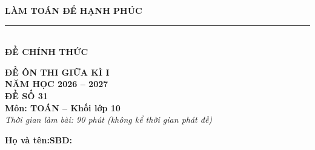 \documentclass[12pt,a4paper]{article}
\begin{document}
\noindent
\begin{minipage}[c]{0.38\textwidth}
    \centering
    \textbf{LÀM TOÁN ĐỂ HẠNH PHÚC}\\[-2pt]
    \rule{3.2cm}{0.6pt}\\[3pt]
    \textbf{ĐỀ CHÍNH THỨC}
\end{minipage}\hfill
\begin{minipage}[c]{0.35\textwidth}
    \centering
    \textbf{ĐỀ ÔN THI GIỮA KÌ I}\\
    \textbf{NĂM HỌC 2026 -- 2027}\\[2pt]
    \textbf{ĐỀ SỐ 31}\\
    \textbf{Môn: TOÁN -- Khối lớp 10}\\
    \textit{\small Thời gian làm bài: 90 phút (không kể thời gian phát đề)}
\end{minipage}

\vspace{0.03cm}
\noindent
\begin{minipage}[b]{0.78\textwidth}
    \textbf{Họ và tên:}\dotfill\textbf{SBD:}\makebox[3.5cm]{\dotfill}
\end{minipage}\hfill
\begin{minipage}[b]{0.20\textwidth}
    \hfill
    \setlength{\fboxrule}{0.8pt}%
\end{minipage}
\vspace{0.03cm}
\end{document}
